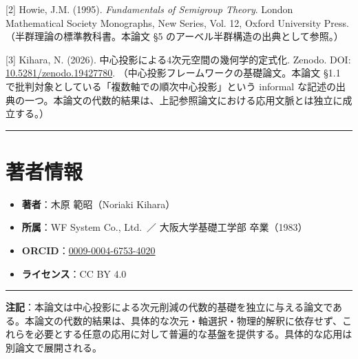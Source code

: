 \documentclass[a4paper,11pt]{ltjsarticle}
\theoremstyle{definition}
\theoremstyle{remark}
\providecommand{\tightlist}{%
  \setlength{\itemsep}{0pt}\setlength{\parskip}{0pt}}
\begin{document}
{[}2{]} Howie, J.M. (1995). \emph{Fundamentals of Semigroup Theory}.
London Mathematical Society Monographs, New Series, Vol. 12, Oxford
University Press. （半群理論の標準教科書。本論文 §5
のアーベル半群構造の出典として参照。）

{[}3{]} Kihara, N. (2026). 中心投影による4次元空間の幾何学的定式化.
Zenodo. DOI:
\href{https://doi.org/10.5281/zenodo.19427780}{10.5281/zenodo.19427780}.
（中心投影フレームワークの基礎論文。本論文 §1.1
で批判対象としている「複数軸での順次中心投影」という informal
な記述の出典の一つ。本論文の代数的結果は、上記参照論文における応用文脈とは独立に成立する。）

\begin{center}\rule{0.5\linewidth}{0.5pt}\end{center}

\section{著者情報}\label{ux8457ux8005ux60c5ux5831}

\begin{itemize}
\tightlist
\item
  \textbf{著者}：木原 範昭（Noriaki Kihara）
\item
  \textbf{所属}：WF System Co., Ltd.~／ 大阪大学基礎工学部 卒業（1983）
\item
  \textbf{ORCID}：\href{https://orcid.org/0009-0004-6753-4020}{0009-0004-6753-4020}
\item
  \textbf{ライセンス}：CC BY 4.0
\end{itemize}

\begin{center}\rule{0.5\linewidth}{0.5pt}\end{center}

\textbf{注記}：本論文は中心投影による次元削減の代数的基礎を独立に与える論文である。本論文の代数的結果は、具体的な次元・軸選択・物理的解釈に依存せず、これらを必要とする任意の応用に対して普遍的な基盤を提供する。具体的な応用は別論文で展開される。
\end{document}
